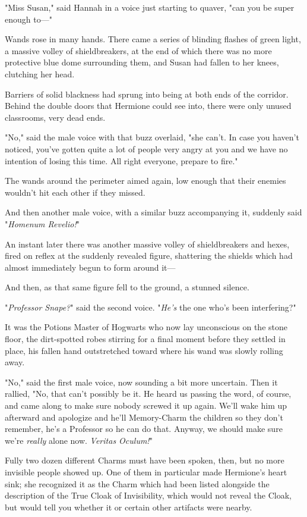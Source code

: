 "Miss Susan," said Hannah in a voice just starting to quaver, "can you be super
enough to\mbox{---}"

Wands rose in many hands. There came a series of blinding flashes of green
light, a massive volley of shieldbreakers, at the end of which there was no
more protective blue dome surrounding them, and Susan had fallen to her knees,
clutching her head.

Barriers of solid blackness had sprung into being at both ends of the corridor.
Behind the double doors that Hermione could see into, there were only unused
classrooms, very dead ends.

"No," said the male voice with that buzz overlaid, "she can't. In case you
haven't noticed, you've gotten quite a lot of people very angry at you and we
have no intention of losing this time. All right everyone, prepare to fire."

The wands around the perimeter aimed again, low enough that their enemies
wouldn't hit each other if they missed.

And then another male voice, with a similar buzz accompanying it, suddenly said
"\emph{Homenum Revelio!}"

An instant later there was another massive volley of shieldbreakers and hexes,
fired on reflex at the suddenly revealed figure, shattering the shields which
had almost immediately begun to form around it---

And then, as that same figure fell to the ground, a stunned silence.

"\emph{Professor Snape?}" said the second voice. "\emph{He's} the one who's
been interfering?"

It was the Potions Master of Hogwarts who now lay unconscious on the stone
floor, the dirt-spotted robes stirring for a final moment before they settled
in place, his fallen hand outstretched toward where his wand was slowly rolling
away.

"No," said the first male voice, now sounding a bit more uncertain. Then it
rallied, "No, that can't possibly be it. He heard us passing the word, of
course, and came along to make sure nobody screwed it up again. We'll wake him
up afterward and apologize and he'll Memory-Charm the children so they don't
remember, he's a Professor so he can do that. Anyway, we should make sure we're
\emph{really} alone now. \emph{Veritas Oculum!}"

Fully two dozen different Charms must have been spoken, then, but no more
invisible people showed up. One of them in particular made Hermione's heart
sink; she recognized it as the Charm which had been listed alongside the
description of the True Cloak of Invisibility, which would not reveal the
Cloak, but would tell you whether it or certain other artifacts were nearby.


